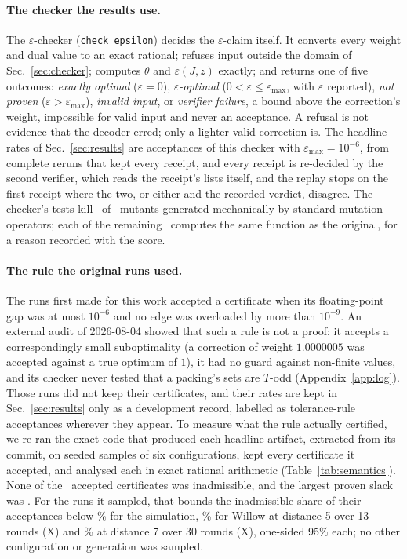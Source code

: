 \documentclass[aps,pra,twocolumn,superscriptaddress,nofootinbib,longbibliography,floatfix]{revtex4-2}
\newcommand{\eps}{\varepsilon}
\newcommand{\T}{T}
\begin{document}
\paragraph*{The checker the results use.} The $\eps$-checker (\texttt{check\_epsilon}) decides the $\eps$-claim itself. It converts every weight and dual value to an exact rational; refuses input outside the domain of Sec.~\ref{sec:checker}; computes $\theta$ and $\eps(J,z)$ exactly; and returns one of five outcomes: \emph{exactly optimal} ($\eps=0$), \emph{$\eps$-optimal} ($0<\eps\le\eps_{\max}$, with $\eps$ reported), \emph{not proven} ($\eps>\eps_{\max}$), \emph{invalid input}, or \emph{verifier failure}, a bound above the correction's weight, impossible for valid input and never an acceptance. A refusal is not evidence that the decoder erred; only a lighter valid correction is. The headline rates of Sec.~\ref{sec:results} are acceptances of this checker with $\eps_{\max}=10^{-6}$, from complete reruns that kept every receipt, and every receipt is re-decided by the second verifier, which reads the receipt's lists itself, and the replay stops on the first receipt where the two, or either and the recorded verdict, disagree. The checker's tests kill \MutEpsKilled\ of \MutEpsRun\ mutants generated mechanically by standard mutation operators; each of the remaining \MutEpsEquivalent\ computes the same function as the original, for a reason recorded with the score.

\paragraph*{The rule the original runs used.} The runs first made for this work accepted a certificate when its floating-point gap was at most $10^{-6}$ and no edge was overloaded by more than $10^{-9}$. An external audit of 2026-08-04 showed that such a rule is not a proof: it accepts a correspondingly small suboptimality (a correction of weight $1.0000005$ was accepted against a true optimum of $1$), it had no guard against non-finite values, and its checker never tested that a packing's sets are $\T$-odd (Appendix~\ref{app:log}). Those runs did not keep their certificates, and their rates are kept in Sec.~\ref{sec:results} only as a development record, labelled as tolerance-rule acceptances wherever they appear. To measure what the rule actually certified, we re-ran the exact code that produced each headline artifact, extracted from its commit, on seeded samples of six configurations, kept every certificate it accepted, and analysed each in exact rational arithmetic (Table~\ref{tab:semantics}). None of the \AuditAccepted\ accepted certificates was inadmissible, and the largest proven slack was \AuditEpsMax. For the runs it sampled, that bounds the inadmissible share of their acceptances below \AuditBoundSimPct\% for the simulation, \AuditBoundWFiveXPct\% for Willow at distance 5 over 13 rounds (X) and \AuditBoundWSevenXPct\% at distance 7 over 30 rounds (X), one-sided 95\% each; no other configuration or generation was sampled.
\end{document}
